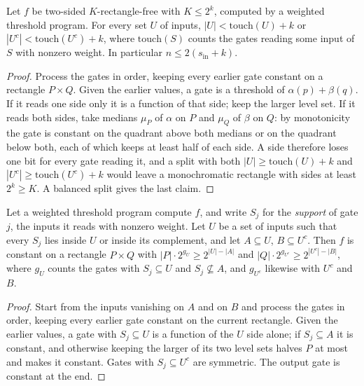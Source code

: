 \begin{theorem}
  \label{thm:lowerbounds-threshold-cut}
  \leanok
  Let $f$ be two-sided $K$-rectangle-free with $K\le2^k$, computed by a
  weighted threshold program. For every set $U$ of inputs,
  $|U|<\mathrm{touch}(U)+k$ or $|U^c|<\mathrm{touch}(U^c)+k$, where
  $\mathrm{touch}(S)$ counts the gates reading some input of $S$ with nonzero
  weight. In particular $n\le2(s_{\mathrm{in}}+k)$.
\end{theorem}
\begin{proof}
  \leanok
  Process the gates in order, keeping every earlier gate constant on a
  rectangle $P\times Q$. Given the earlier values, a gate is a threshold of
  $\alpha(p)+\beta(q)$. If it reads one side only it is a function of that
  side; keep the larger level set. If it reads both sides, take medians
  $\mu_P$ of $\alpha$ on $P$ and $\mu_Q$ of $\beta$ on $Q$: by monotonicity
  the gate is constant on the quadrant above both medians or on the quadrant
  below both, each of which keeps at least half of each side. A side therefore
  loses one bit for every gate reading it, and a split with both
  $|U|\ge\mathrm{touch}(U)+k$ and $|U^c|\ge\mathrm{touch}(U^c)+k$ would leave a
  monochromatic rectangle with sides at least $2^k\ge K$. A balanced split
  gives the last claim.
\end{proof}

\begin{theorem}
  \label{thm:lowerbounds-threshold-split}
  \leanok
  Let a weighted threshold program compute $f$, and write $S_j$ for the
  \emph{support} of gate $j$, the inputs it reads with nonzero weight. Let $U$
  be a set of inputs such that every $S_j$ lies inside $U$ or inside its
  complement, and let $A\subseteq U$, $B\subseteq U^c$. Then $f$ is constant on
  a rectangle $P\times Q$ with
  $|P|\cdot2^{g_U}\ge2^{|U|-|A|}$ and $|Q|\cdot2^{g_{U^c}}\ge2^{|U^c|-|B|}$,
  where $g_U$ counts the gates with $S_j\subseteq U$ and $S_j\not\subseteq A$,
  and $g_{U^c}$ likewise with $U^c$ and $B$.
\end{theorem}
\begin{proof}
  \leanok
  Start from the inputs vanishing on $A$ and on $B$ and process the gates in
  order, keeping every earlier gate constant on the current rectangle. Given
  the earlier values, a gate with $S_j\subseteq U$ is a function of the $U$
  side alone; if $S_j\subseteq A$ it is constant, and otherwise keeping the
  larger of its two level sets halves $P$ at most and makes it constant.
  Gates with $S_j\subseteq U^c$ are symmetric. The output gate is constant at
  the end.
\end{proof}

